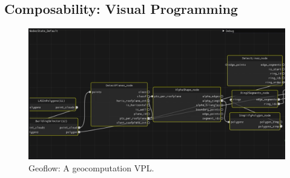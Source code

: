 
 






\subsection*{Composability: Visual Programming}

\begin{figure}
  \centering
  \graphicspath{{../../assets/images/background/geo-vpl/}}
  \includegraphics[width=\linewidth]{geoflow.png}
  \caption{Geoflow: A geocomputation VPL. \citep{peters_geoflow_2019}}
  \label{fig:1:geoflow}
\end{figure}

